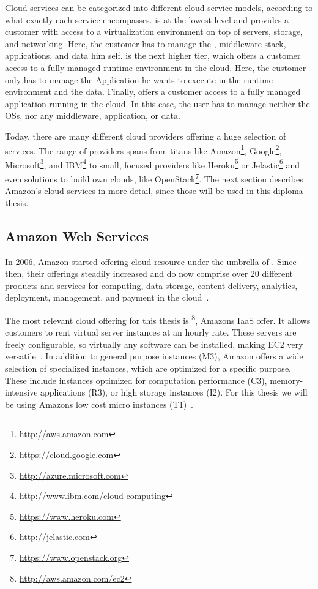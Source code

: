 Cloud services can be categorized into different cloud service models, according to what exactly each service encompasses.
 is at the lowest level and provides a customer with access to a virtualization environment on top of servers, storage, and networking. Here, the customer has to manage the , middleware stack, applications, and data him self.
 is the next higher tier, which offers a customer access to a fully managed runtime environment in the cloud.
Here, the customer only has to manage the Application he wants to execute in the runtime environment and the data.
Finally,  offers a customer access to a fully managed application running in the cloud.
In this case, the user has to manage neither the OSs, nor any middleware, application, or data.

Today, there are many different cloud providers offering a huge selection of services.
The range of providers spans from titans like Amazon\footnote{\url{http://aws.amazon.com}}, Google\footnote{\url{https://cloud.google.com}}, Microsoft\footnote{\url{http://azure.microsoft.com}}, and IBM\footnote{\url{http://www.ibm.com/cloud-computing}} to small, focused providers like Heroku\footnote{\url{https://www.heroku.com}} or Jelastic\footnote{\url{http://jelastic.com}} and even solutions to build own clouds, like OpenStack\footnote{\url{https://www.openstack.org}}.
The next section describes Amazon's cloud services in more detail, since those will be used in this diploma thesis.

\subsection{Amazon Web Services}

In 2006, Amazon started offering cloud resource under the umbrella of .
Since then, their offerings steadily increased and do now comprise over 20 different products and services for computing, data storage, content delivery, analytics, deployment, management, and payment in the cloud~\autocite{aws:about}.

The most relevant cloud offering for this thesis is \footnote{\url{http://aws.amazon.com/ec2}}, Amazons IaaS offer.
It allows customers to rent virtual server instances at an hourly rate.
These servers are freely configurable, so virtually any software can be installed, making EC2 very versatile~\autocite{aws:ec2}.
In addition to general purpose instances (M3), Amazon offers a wide selection of specialized instances, which are optimized for a specific purpose.
These include instances optimized for computation performance (C3), memory-intensive applications (R3), or high storage instances (I2).
For this thesis we will be using Amazons low cost micro instances (T1)~\autocite{aws:instances}.

